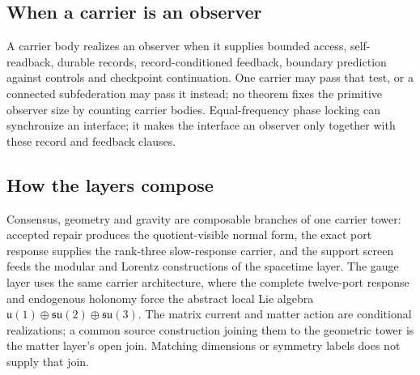 \subsection*{When a carrier is an observer}

A carrier body realizes an observer when it supplies bounded access,
self-readback, durable records, record-conditioned feedback, boundary
prediction against controls and checkpoint continuation. One carrier may
pass that test, or a connected subfederation may pass it instead; no theorem
fixes the primitive observer size by counting carrier bodies. Equal-frequency
phase locking can synchronize an interface; it makes the interface an
observer only together with these record and feedback clauses.

\subsection*{How the layers compose}

Consensus, geometry and gravity are composable branches of one carrier
tower: accepted repair produces the quotient-visible normal form, the exact
port response supplies the rank-three slow-response carrier, and the
support screen feeds the modular and Lorentz constructions of the spacetime
layer. The gauge layer uses the same carrier architecture, where the
complete twelve-port response and endogenous holonomy force the abstract
local Lie algebra \(\mathfrak u(1)\oplus\mathfrak{su}(2)\oplus
\mathfrak{su}(3)\). The matrix current and matter action are conditional
realizations; a common source construction joining them to the geometric
tower is the matter layer's open join. Matching dimensions or symmetry
labels does not supply that join.
